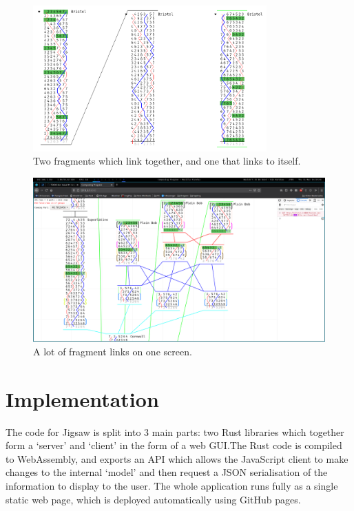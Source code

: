 \documentclass[12pt]{article}
\begin{document}
\begin{figure}
    \centering
    \includegraphics[width=0.8\textwidth]{linking-2}
    \caption{Two fragments which link together, and one that links to itself.}\label{fig:linking}
\end{figure}

\begin{figure}[h!]
    \centering
    \includegraphics[width=\textwidth]{linking-insane}
    \caption{A lot of fragment links on one screen.}\label{fig:linking-insane}
\end{figure}

\section{Implementation}\label{sec:proj_arch}

The code for Jigsaw is split into 3 main parts: two Rust libraries which together form a `server'
and `client' in the form of a web GUI.\@  The Rust code is compiled to WebAssembly, and exports an
API which allows the JavaScript client to make changes to the internal `model' and then request a
JSON serialisation of the information to display to the user.  The whole application runs fully as a
single static web page, which is deployed automatically using GitHub pages.
\end{document}
